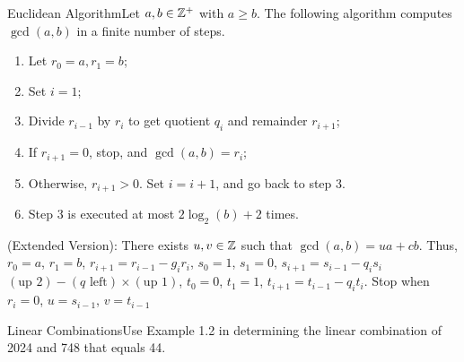 \begin{theorem}
    {Euclidean Algorithm}Let $a,b \in \mathbb{Z}^+$ with $a \geq b$. The following algorithm computes $\gcd(a,b)$ in a finite number of steps. \begin{enumerate}
        \item Let $r_0 = a, r_1 = b$;
        \item Set $i = 1$;
        \item Divide $r_{i - 1}$ by $r_i$ to get quotient $q_i$ and remainder $r_{i + 1}$;
        \item If $r_{i + 1} = 0$, stop, and $\gcd(a,b) = r_i$;
        \item Otherwise, $r_{i + 1} > 0$. Set $i = i + 1$, and go back to step 3.
        \item Step 3 is executed at most $2\log_2(b) + 2$ times.
    \end{enumerate}
    (Extended Version): There exists $u,v \in \mathbb{Z}$ such that $\gcd(a,b) = ua + cb$. Thus, $r_0 = a$, $r_1 = b$, $r_{i + 1} = r_{i - 1} - g_ir_i$, $s_0 = 1$, $s_1 = 0$, $s_{i + 1} = s_{i - 1} - q_is_i$ $(\text{up } 2) - (q\text{ left}) \times (\text{up } 1)$, $t_0 = 0$, $t_1 = 1$, $t_{i + 1} = t_{i - 1} - q_it_i$. Stop when $r_i = 0$, $u = s_{i - 1}$, $v = t_{i - 1}$
\end{theorem}

\begin{example}
    {Linear Combinations}Use Example 1.2 in determining the linear combination of 2024 and 748 that equals 44.
\end{example}


